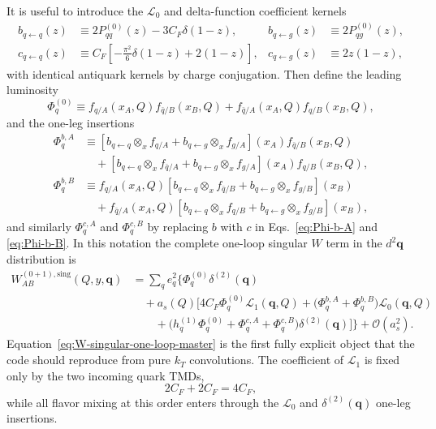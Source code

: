 \documentclass[11pt]{article}
\newcommand{\bq}{\bm{q}}
\newcommand{\deltaT}{\delta^{(2)}}
\newcommand{\ox}{\otimes_x}
\newcommand{\order}[1]{\mathcal{O}\!\left(#1\right)}
\newcommand{\sing}{\mathrm{sing}}
\begin{document}
It is useful to introduce the $\mathcal L_0$ and delta-function coefficient kernels
\begin{align}
  b_{q\leftarrow q}(z)
  &\equiv 2P_{qq}^{(0)}(z)-3C_F\delta(1-z),
  &
  b_{q\leftarrow g}(z)
  &\equiv 2P_{qg}^{(0)}(z),
  \label{eq:b-kernels-validation}
  \\
  c_{q\leftarrow q}(z)
  &\equiv C_F\left[-\frac{\pi^2}{6}\delta(1-z)+2(1-z)\right],
  &
  c_{q\leftarrow g}(z)
  &\equiv 2z(1-z),
  \label{eq:c-kernels-validation}
\end{align}
with identical antiquark kernels by charge conjugation. Then define the leading luminosity
\begin{equation}
  \Phi_q^{(0)}
  \equiv
  f_{q/A}(x_A,Q)f_{\bar q/B}(x_B,Q)
  +f_{\bar q/A}(x_A,Q)f_{q/B}(x_B,Q),
  \label{eq:Phi0}
\end{equation}
and the one-leg insertions
\begin{align}
  \Phi_q^{b,A}
  &\equiv
  \left[b_{q\leftarrow q}\ox f_{q/A}+b_{q\leftarrow g}\ox f_{g/A}\right](x_A)
  f_{\bar q/B}(x_B,Q)
  \\
  &\quad+
  \left[b_{q\leftarrow q}\ox f_{\bar q/A}+b_{q\leftarrow g}\ox f_{g/A}\right](x_A)
  f_{q/B}(x_B,Q),
  \label{eq:Phi-b-A}
  \\
  \Phi_q^{b,B}
  &\equiv
  f_{q/A}(x_A,Q)
  \left[b_{q\leftarrow q}\ox f_{\bar q/B}+b_{q\leftarrow g}\ox f_{g/B}\right](x_B)
  \\
  &\quad+
  f_{\bar q/A}(x_A,Q)
  \left[b_{q\leftarrow q}\ox f_{q/B}+b_{q\leftarrow g}\ox f_{g/B}\right](x_B),
  \label{eq:Phi-b-B}
\end{align}
and similarly $\Phi_q^{c,A}$ and $\Phi_q^{c,B}$ by replacing $b$ with $c$ in
Eqs.~\eqref{eq:Phi-b-A} and \eqref{eq:Phi-b-B}. In this notation the complete one-loop
singular $W$ term in the $d^2\bq$ distribution is
\begin{align}
  W_{AB}^{(0+1),\sing}(Q,y,\bq)
  &=
  \sum_q e_q^2
  \Bigg\{
  \Phi_q^{(0)}\deltaT(\bq)
  \\
  &\quad
  +a_s(Q)\Big[
    4C_F\Phi_q^{(0)}\mathcal L_1(\bq,Q)
    +\bigl(\Phi_q^{b,A}+\Phi_q^{b,B}\bigr)\mathcal L_0(\bq,Q)
  \\
  &\qquad
    +\Big(h_q^{(1)}\Phi_q^{(0)}+
      \Phi_q^{c,A}+\Phi_q^{c,B}\Big)\deltaT(\bq)
  \Big]\Bigg\}
  +\order{a_s^2}.
  \label{eq:W-singular-one-loop-master}
\end{align}
Equation~\eqref{eq:W-singular-one-loop-master} is the first fully explicit object that the
code should reproduce from pure $k_T$ convolutions. The coefficient of $\mathcal L_1$ is
fixed only by the two incoming quark TMDs,
\begin{equation}
  2C_F+2C_F=4C_F,
  \label{eq:DY-L1-check}
\end{equation}
while all flavor mixing at this order enters through the $\mathcal L_0$ and
$\deltaT(\bq)$ one-leg insertions.
\end{document}
